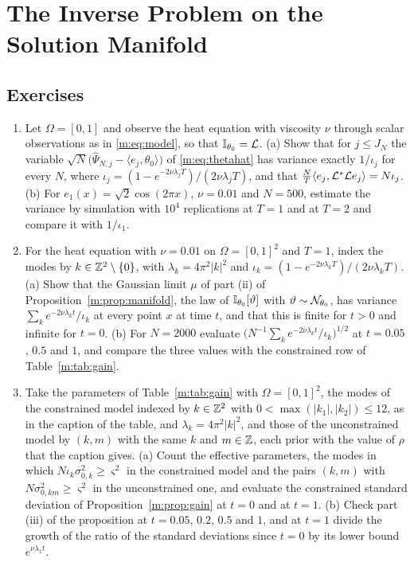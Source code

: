 \chapter{The Inverse Problem on the Solution Manifold}
\label{ch:manifold}




\section*{Exercises}
\begin{enumerate}
\item Let $\Omega=[0,1]$ and observe the heat equation with viscosity $\nu$ through scalar observations as in \eqref{m:eq:model}, so that $\mathbb{I}_{\theta_0}=\mathcal{L}$. (a) Show that for $j\le J_N$ the variable $\sqrt N\big(\hat\Psi_{N,j}-\langle e_j,\theta_0\rangle\big)$ of \eqref{m:eq:thetahat} has variance exactly $1/\iota_j$ for every $N$, where $\iota_j=(1-e^{-2\nu\lambda_jT})/(2\nu\lambda_jT)$, and that $\tfrac NT\langle e_j,\mathcal{L}^*\mathcal{L} e_j\rangle=N\iota_j$. (b) For $e_1(x)=\sqrt2\cos(2\pi x)$, $\nu=0.01$ and $N=500$, estimate the variance by simulation with $10^4$ replications at $T=1$ and at $T=2$ and compare it with $1/\iota_1$.
\item For the heat equation with $\nu=0.01$ on $\Omega=[0,1]^2$ and $T=1$, index the modes by $k\in\mathbb{Z}^2\setminus\{0\}$, with $\lambda_k=4\pi^2|k|^2$ and $\iota_k=(1-e^{-2\nu\lambda_kT})/(2\nu\lambda_kT)$. (a) Show that the Gaussian limit $\mu$ of part (ii) of Proposition~\ref{m:prop:manifold}, the law of $\mathbb{I}_{\theta_0}[\vartheta]$ with $\vartheta\sim\mathcal{N}_{\theta_0}$, has variance $\sum_ke^{-2\nu\lambda_kt}/\iota_k$ at every point $x$ at time $t$, and that this is finite for $t>0$ and infinite for $t=0$. (b) For $N=2000$ evaluate $\big(N^{-1}\sum_ke^{-2\nu\lambda_kt}/\iota_k\big)^{1/2}$ at $t=0.05$, $0.5$ and $1$, and compare the three values with the constrained row of Table~\ref{m:tab:gain}.
\item Take the parameters of Table~\ref{m:tab:gain} with $\Omega=[0,1]^2$, the modes of the constrained model indexed by $k\in\mathbb{Z}^2$ with $0<\max(|k_1|,|k_2|)\le12$, as in the caption of the table, and $\lambda_k=4\pi^2|k|^2$, and those of the unconstrained model by $(k,m)$ with the same $k$ and $m\in\mathbb{Z}$, each prior with the value of $\rho$ that the caption gives. (a) Count the effective parameters, the modes in which $N\iota_k\sigma_{0,k}^2\ge\varsigma^2$ in the constrained model and the pairs $(k,m)$ with $N\sigma_{0,km}^2\ge\varsigma^2$ in the unconstrained one, and evaluate the constrained standard deviation of Proposition~\ref{m:prop:gain} at $t=0$ and at $t=1$. (b) Check part (iii) of the proposition at $t=0.05$, $0.2$, $0.5$ and $1$, and at $t=1$ divide the growth of the ratio of the standard deviations since $t=0$ by its lower bound $e^{\nu\lambda_1t}$.

\end{enumerate}
